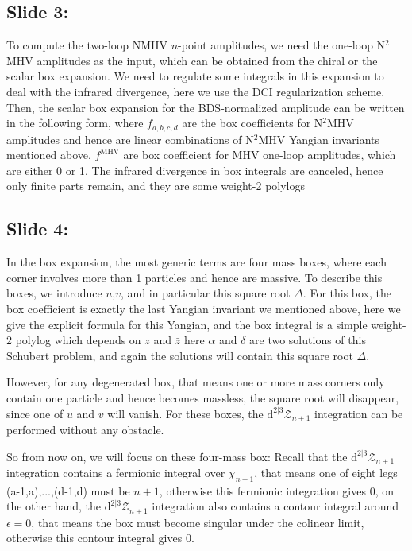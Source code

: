\documentclass[a4paper,11pt]{article}
\begin{document}
\subsection{Slide 3:}

 To compute the two-loop NMHV $n$-point amplitudes, we need the one-loop N$^{2}$MHV amplitudes as the input, which can be obtained from the chiral or the scalar box expansion. We need to regulate some integrals in this expansion to deal with the infrared divergence, here we use the DCI regularization scheme. Then, the scalar box expansion for the BDS-normalized amplitude can be written in the following form, where $f_{a,b,c,d}$ are the box coefficients for N$^{2}$MHV amplitudes and hence are linear combinations of N$^{2}$MHV Yangian invariants mentioned above, $f^{\text{MHV}}$ are box coefficient for MHV one-loop amplitudes, which are either 0 or 1. The infrared divergence in box integrals are canceled, hence only finite parts remain, and they are some weight-2 polylogs

 \subsection{Slide 4:}
In the box expansion, the most generic terms are four mass boxes, where each corner involves more than 1 particles and hence are massive. To describe this boxes, we introduce $u$,$v$, and in particular this square root $\Delta$. For this box, the box coefficient is exactly the last Yangian invariant we mentioned above, here we give the explicit formula for this Yangian, and the box integral is a simple weight-2 polylog which depends on $z$ and $\bar{z}$ here $\alpha$ and $\delta$ are two solutions of this Schubert problem, and again the solutions will contain this square root $\Delta$. 

However, for any degenerated box, that means one or more mass corners only contain one particle and hence becomes massless, the square root will disappear, since one of $u$ and $v$ will vanish. For these boxes, the $\mathrm{d}^{2\vert 3}\mathcal{Z}_{n+1}$ integration can be performed without any obstacle. 

So from now on, we will focus on these four-mass box: Recall that the $\mathrm{d}^{2\vert 3}\mathcal{Z}_{n+1}$ integration contains a fermionic integral over $\chi_{n+1}$, that means one of eight legs (a-1,a),...,(d-1,d) must be $n{+}1$, otherwise this fermionic integration gives 0, on the other hand, the $\mathrm{d}^{2\vert 3}\mathcal{Z}_{n+1}$ integration also contains a contour integral around $\epsilon=0$, that means the box must become singular under the colinear limit, otherwise this contour integral gives 0. 
\end{document}
